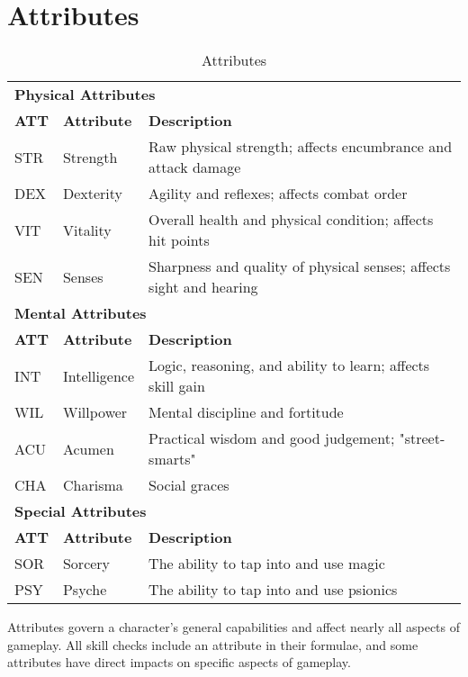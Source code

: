 \chapter{Attributes}\label{attributes}

\begin{multicols*}{2}
    \begin{table*}[ht]
        \unclassedrowcolors
        \begin{tabularx}{\textwidth}{l l X}
            \multicolumn{3}{l}{\textbf{Physical Attributes}} \\
            \textbf{ATT} & \textbf{Attribute} & \textbf{Description} \\
            STR & Strength & Raw physical strength; affects encumbrance and attack damage \\
            DEX & Dexterity & Agility and reflexes; affects combat order \\
            VIT & Vitality & Overall health and physical condition; affects hit points \\
            SEN & Senses & Sharpness and quality of physical senses; affects sight and hearing \\
            \multicolumn{3}{l}{\bfseries{Mental Attributes}} \\
            \textbf{ATT} & \textbf{Attribute} & \textbf{Description} \\
            INT & Intelligence & Logic, reasoning, and ability to learn; affects skill gain \\
            WIL & Willpower & Mental discipline and fortitude \\
            ACU & Acumen & Practical wisdom and good judgement; "street-smarts" \\
            CHA & Charisma & Social graces \\
            \multicolumn{3}{l}{\textbf{Special Attributes}} \\
            \textbf{ATT} & \textbf{Attribute} & \textbf{Description} \\
            SOR & Sorcery & The ability to tap into and use magic \\
            PSY & Psyche & The ability to tap into and use psionics \\
        \end{tabularx}
        \caption{Attributes}
        \label{tab:attributes}
    \end{table*}
    Attributes govern a character's general capabilities and affect nearly all
    aspects of gameplay. All skill checks include an attribute in their formulae,
    and some attributes have direct impacts on specific aspects of gameplay.


\end{multicols*}
